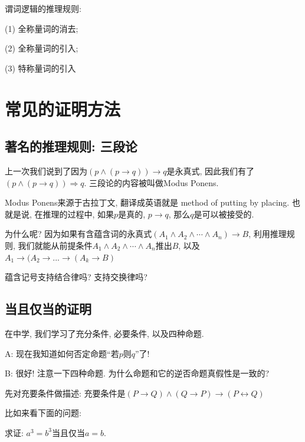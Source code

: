 \begin{theorem}
	谓词逻辑的推理规则: 
	
	(1) 全称量词的消去;
	
	(2) 全称量词的引入;
	
	(3) 特称量词的引入
	
\end{theorem}


\section{常见的证明方法}

\subsection*{著名的推理规则: 三段论}

上一次我们说到了因为$(p\land (p\to q))\to q$是永真式, 因此我们有了$(p\land (p\to q))\Rightarrow q$. 三段论的内容被叫做Modus Ponens. 

Modus Ponens来源于古拉丁文, 翻译成英语就是 method of putting by placing. 也就是说, 在推理的过程中, 如果$p$是真的, $p\rightarrow q$, 那么$q$是可以被接受的. 

为什么呢? 因为如果有含蕴含词的永真式$(A_1\land A_2\land\cdots\land A_n)\to B$, 利用推理规则, 我们就能从前提条件$A_1\land A_2\land\cdots\land A_n$推出$B$, 以及$A_1 \rightarrow (A_2 \rightarrow ... \rightarrow (A_k\rightarrow B)$

\begin{bonus}
	蕴含记号支持结合律吗? 支持交换律吗? 
\end{bonus}

\subsection*{当且仅当的证明}

在中学, 我们学习了充分条件, 必要条件, 以及四种命题. 

\begin{dialogue}
	A: 现在我知道如何否定命题``若$p$则$q$''了!
	
	B: 很好! 注意一下四种命题. 为什么命题和它的逆否命题真假性是一致的?  
\end{dialogue}

先对充要条件做描述: 充要条件是$(P\rightarrow Q)\land (Q\rightarrow P)\rightarrow (P\leftrightarrow Q)$

比如来看下面的问题: 

\begin{prob}
	求证: $a^3=b^3$当且仅当$a=b$.
\end{prob}


